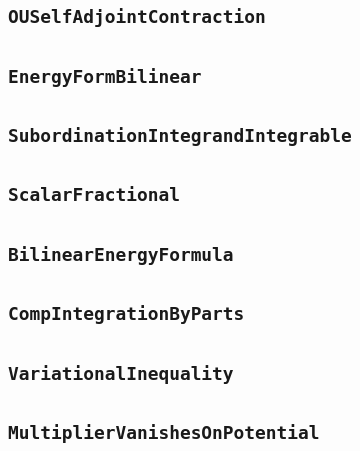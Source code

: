 \documentclass[11pt]{amsart}
\theoremstyle{definition}
\begin{document}
\subsection{\texorpdfstring{\texttt{OUSelfAdjointContraction}}{OUSelfAdjointContraction}}\label{node:OUSelfAdjointContraction}


\subsection{\texorpdfstring{\texttt{EnergyFormBilinear}}{EnergyFormBilinear}}\label{node:EnergyFormBilinear}


\subsection{\texorpdfstring{\texttt{SubordinationIntegrandIntegrable}}{SubordinationIntegrandIntegrable}}\label{node:SubordinationIntegrandIntegrable}


\subsection{\texorpdfstring{\texttt{ScalarFractional}}{ScalarFractional}}\label{node:ScalarFractional}


\subsection{\texorpdfstring{\texttt{BilinearEnergyFormula}}{BilinearEnergyFormula}}\label{node:BilinearEnergyFormula}


\subsection{\texorpdfstring{\texttt{CompIntegrationByParts}}{CompIntegrationByParts}}\label{node:CompIntegrationByParts}


\subsection{\texorpdfstring{\texttt{VariationalInequality}}{VariationalInequality}}\label{node:VariationalInequality}


\subsection{\texorpdfstring{\texttt{MultiplierVanishesOnPotential}}{MultiplierVanishesOnPotential}}\label{node:MultiplierVanishesOnPotential}

\end{document}
